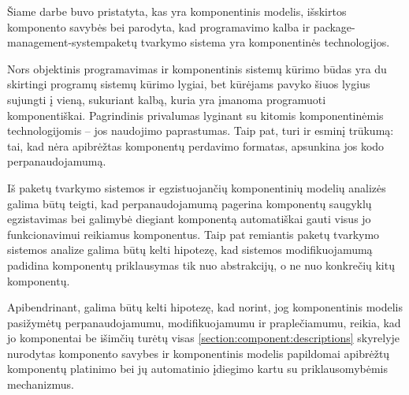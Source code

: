


Šiame darbe buvo pristatyta, kas yra komponentinis modelis, išskirtos
komponento savybės bei parodyta, kad  programavimo
kalba ir  \gls{package-management-system}{paketų
tvarkymo sistema} yra komponentinės technologijos.

Nors objektinis programavimas ir komponentinis sistemų kūrimo būdas
yra du skirtingi programų sistemų kūrimo lygiai, bet
 kūrėjams pavyko šiuos lygius sujungti į vieną,
sukuriant kalbą, kuria yra įmanoma programuoti komponentiškai.
Pagrindinis  privalumas lyginant su kitomis
komponentinėmis technologijomis – jos naudojimo paprastumas. Taip pat,
 turi ir esminį trūkumą: tai, kad nėra apibrėžtas
 komponentų perdavimo formatas, apsunkina jos kodo
perpanaudojamumą.

Iš  paketų tvarkymo sistemos ir egzistuojančių
komponentinių modelių analizės galima būtų teigti, kad
perpanaudojamumą pagerina komponentų saugyklų egzistavimas bei galimybė
diegiant komponentą automatiškai gauti visus jo funkcionavimui
reikiamus komponentus. Taip pat remiantis  paketų
tvarkymo sistemos analize galima būtų kelti hipotezę, kad
sistemos modifikuojamumą padidina komponentų priklausymas tik nuo
abstrakcijų, o ne nuo konkrečių kitų komponentų.

Apibendrinant, galima būtų kelti hipotezę, kad norint, jog
komponentinis modelis pasižymėtų perpanaudojamumu, modifikuojamumu ir
praplečiamumu, reikia, kad jo komponentai be išimčių turėtų visas
\ref{section:component:descriptions} skyrelyje nurodytas komponento
savybes ir komponentinis modelis papildomai apibrėžtų komponentų
platinimo bei jų automatinio įdiegimo kartu su priklausomybėmis
mechanizmus.
